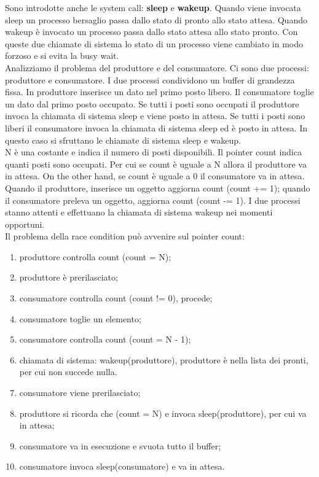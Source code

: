 \documentclass{article}
\begin{document}
Sono introdotte anche le system call: \textbf{sleep} e \textbf{wakeup}. Quando viene invocata sleep un processo bersaglio passa dallo stato di pronto allo stato attesa. Quando wakeup è invocato un processo passa dallo stato attesa allo stato pronto. Con queste due chiamate di sistema lo stato di un processo viene cambiato in modo forzoso e si evita la busy wait.\\

Analizziamo il problema del produttore e del consumatore. Ci sono due processi: produttore e consumatore. I due processi condividono un buffer di grandezza fissa. In produttore inserisce un dato nel primo posto libero. Il consumatore toglie un dato dal primo posto occupato. Se tutti i posti sono occupati il produttore invoca la chiamata di sistema sleep e viene posto in attesa. Se tutti i posti sono liberi il consumatore invoca la chiamata di sistema sleep ed è posto in attesa. In questo caso si sfruttano le chiamate di sistema sleep e wakeup.\\

N è una costante e indica il numero di posti disponibili. Il pointer count indica quanti posti sono occupati. Per cui se count è uguale a N allora il produttore va in attesa. On the other hand, se count è uguale a 0 il consumatore va in attesa. Quando il produttore, inserisce un oggetto aggiorna count (count += 1); quando il consumatore preleva un oggetto, aggiorna count (count -= 1). I due processi stanno attenti e effettuano la chiamata di sistema wakeup nei momenti opportuni.\\

Il problema della race condition può avvenire sul pointer count:
\begin{enumerate}
	\item produttore controlla count (count = N);
	\item produttore è prerilasciato;
	\item consumatore controlla count (count != 0), procede;
	\item consumatore toglie un elemento;
	\item consumatore controlla count (count = N - 1);
	\item chiamata di sistema: wakeup(produttore), produttore è nella lista dei pronti, per cui non succede nulla.
	\item consumatore viene prerilasciato;
	\item produttore si ricorda che (count = N) e invoca sleep(produttore), per cui va in attesa;
	\item consumatore va in esecuzione e svuota tutto il buffer;
	\item consumatore invoca sleep(consumatore) e va in attesa.
\end{enumerate}
\end{document}
